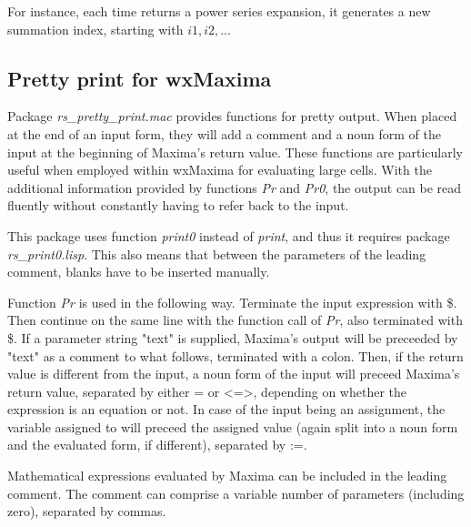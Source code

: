 \documentclass[../Maxima_Workbook.tex]{subfiles}
\begin{document}
\lz For instance, each time  returns a power series expansion, it generates a new summation index, starting with $ i1, i2, \dots $

\subsection{Pretty print for wxMaxima}

Package \emph{rs\_pretty\_print.mac} provides functions for pretty output. When placed at the end of an input form, they will add a comment and a noun form of the input at the beginning of Maxima's return value. These functions are particularly useful when employed within wxMaxima for evaluating large cells. With the additional information provided by functions \emph{Pr} and \emph{Pr0}, the output can be read fluently without constantly having to refer back to the input. 

\lz This package uses function \emph{print0} instead of \emph{print}, and thus it requires package \emph{rs\_print0.lisp}. This also means that between the parameters of the leading comment, blanks have to be inserted manually.

\lzz {} \hfill {}
	
 \hfill {}

 \hfill {}

\lz Function \emph{Pr} is used in the following way. Terminate the input expression with \$. Then continue on the same line with the function call of \emph{Pr}, also terminated with \$. If a parameter string "text" is supplied, Maxima's output will be preceeded by "text" as a comment to what follows, terminated with a colon. Then, if the return value is different from the input, a noun form of the input will preceed Maxima's return value, separated by either = or <=>, depending on whether the expression is an equation or not. In case of the input being an assignment, the variable assigned to will preceed the assigned value (again split into a noun form and the evaluated form, if different), separated by :=. 

\lz Mathematical expressions evaluated by Maxima can be included in the leading comment. The comment can comprise a variable number of parameters (including zero), separated by commas.
\end{document}
